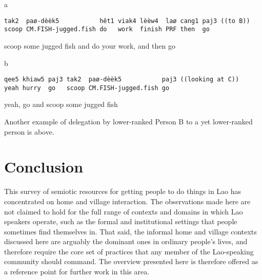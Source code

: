 \documentclass[output=paper]{langsci/langscibook}
\begin{document}
\vspace{-1mm}
%
\begin{mdframednoverticalspace}[style=firstfoc]
\begin{transbox}{1}{a}
\begin{verbatim}
tak2  paø-dèèk5           hêt1 viak4 lèèw4  laø cang1 paj3 ((to B))
scoop CM.FISH-jugged.fish do   work  finish PRF then  go
\end{verbatim}
scoop some jugged fish and do your work, and then go
\end{transbox}
\end{mdframednoverticalspace}
%
\begin{mdframednoverticalspace}[style=firstfoc]
\begin{transbox}{2}{b}
\begin{verbatim}
qee5 khiaw5 paj3 tak2  paø-dèèk5           paj3 ((looking at C))
yeah hurry  go   scoop CM.FISH-jugged.fish go
\end{verbatim}
yeah, go and scoop some jugged fish
\end{transbox}
\end{mdframednoverticalspace}
%
\begin{mdframednoverticalspace}[style=secondfoc]
\end{mdframednoverticalspace}

Another example of delegation by lower-ranked Person B to a yet lower-ranked person is  above. %

\section{Conclusion}

This survey of semiotic resources for getting people to do things in Lao has concentrated on home and village interaction. The observations made here are not claimed to hold for the full range of contexts and domains in which Lao speakers operate, such as the formal and institutional settings that people sometimes find themselves in. That said, the informal home and village contexts discussed here are arguably the dominant ones in ordinary people’s lives, and therefore require the core set of practices that any member of the Lao-speaking community should command. The overview presented here is therefore offered as a reference point for further work in this area.
\end{document}
